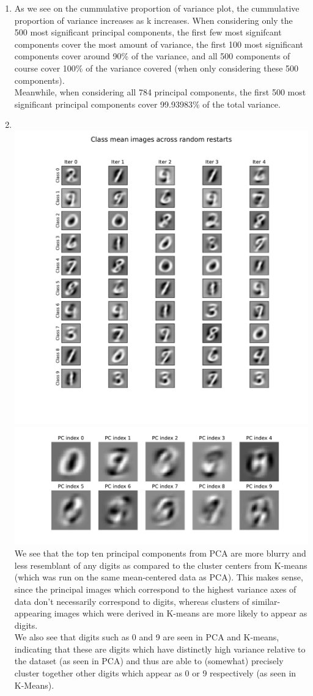 \documentclass[submit]{harvardml}
\begin{document}
\begin{enumerate}
  \item As we see on the cummulative proportion of variance plot, the cummulative proportion of variance increases as k increases. When considering only the 500 most significant principal components, the first few most signifcant components cover the most amount of variance, the first 100 most significant components cover around 90\% of the variance, and all 500 components of course cover 100\% of the variance covered (when only considering these 500 components). \\
  Meanwhile, when considering all 784 principal components, the first 500 most significant principal components cover 99.93983\% of the total variance.
  
  \item \\
  \includegraphics[width=0.75\linewidth]{HW5/k_means.pdf} \\
    \includegraphics[width=0.75\linewidth]{p2_pcomps} \\

  We see that the top ten principal components from PCA are more blurry and less resemblant of any digits as compared to the cluster centers from K-means (which was run on the same mean-centered data as PCA). This makes sense, since the principal images which correspond to the highest variance axes of data don't necessarily correspond to digits, whereas clusters of similar-appearing images which were derived in K-means are more likely to appear as digits. \\
  We also see that digits such as 0 and 9 are seen in PCA and K-means, indicating that these are digits which have distinctly high variance relative to the dataset (as seen in PCA) and thus are able to (somewhat) precisely cluster together other digits which appear as 0 or 9 respectively (as seen in K-Means).


\end{enumerate}
\end{document}

